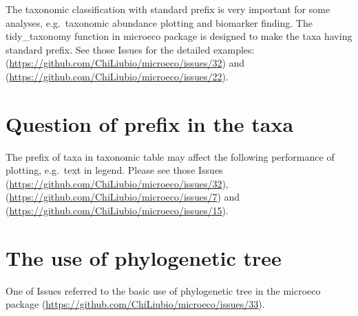 \documentclass[
]{book}
\begin{document}
The taxonomic classification with standard prefix is very important for some analyses,
e.g.~taxonomic abundance plotting and biomarker finding.
The tidy\_taxonomy function in microeco package is designed to make the taxa having standard prefix.
See those Issues for the detailed examples: (\url{https://github.com/ChiLiubio/microeco/issues/32}) and (\url{https://github.com/ChiLiubio/microeco/issues/22}).

\hypertarget{question-of-prefix-in-the-taxa}{%
\section{Question of prefix in the taxa}\label{question-of-prefix-in-the-taxa}}

The prefix of taxa in taxonomic table may affect the following performance of plotting, e.g.~text in legend.
Please see those Issues (\url{https://github.com/ChiLiubio/microeco/issues/32}), (\url{https://github.com/ChiLiubio/microeco/issues/7})
and (\url{https://github.com/ChiLiubio/microeco/issues/15}).

\hypertarget{the-use-of-phylogenetic-tree}{%
\section{The use of phylogenetic tree}\label{the-use-of-phylogenetic-tree}}

One of Issues referred to the basic use of phylogenetic tree in the microeco package (\url{https://github.com/ChiLiubio/microeco/issues/33}).

  
\end{document}
